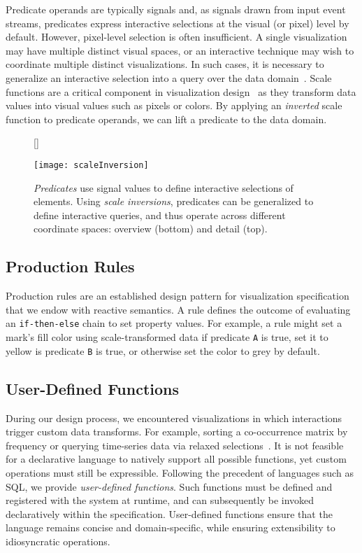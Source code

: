 Predicate operands are typically signals and, as signals drawn from input event
streams, predicates express interactive selections at the visual (or pixel)
level by default. However, pixel-level selection is often insufficient. A single
visualization may have multiple distinct visual spaces, or an interactive
technique may wish to coordinate multiple distinct visualizations. In such
cases, it is necessary to generalize an interactive selection into a query over
the data domain~\cite{heer:generalized}. Scale functions are a critical
component in visualization design~ \cite{wilkinson:grammar} as they transform
data values into visual values such as pixels or colors. By applying an
\emph{inverted} scale function to predicate operands, we can lift a predicate to
the data domain.

\begin{figure}[h!]
  [\FBwidth]
  {\caption{\emph{Predicates} use signal values to define interactive selections
of elements. Using \emph{scale inversions}, predicates can be generalized to
define interactive queries, and thus operate across different coordinate spaces:
overview (bottom) and detail (top).}
  \label{fig:vl:scaleInversion}}
  {\texttt{[image: scaleInversion]}}
\end{figure}

\subsection{Production Rules}

Production rules are an established design pattern for visualization
specification~\cite{heer:designpatterns} that we endow with reactive semantics.
A rule defines the outcome of evaluating an \texttt{if-then-else} chain to set
property values. For example, a rule might set a mark's fill color using
scale-transformed data if predicate \texttt{A} is true, set it to yellow is
predicate \texttt{B} is true, or otherwise set the color to grey by default.

\subsection{User-Defined Functions}
\label{sec:udfs}

During our design process, we encountered visualizations in which interactions
trigger custom data transforms. For example, sorting a co-occurrence matrix by
frequency or querying time-series data via relaxed
selections~\cite{holz:relaxed}. It is not feasible for a declarative language to
natively support all possible functions, yet custom operations must still be
expressible. Following the precedent of languages such as SQL, we provide
\emph{user-defined functions}. Such functions must be defined and registered
with the system at runtime, and can subsequently be invoked declaratively within
the specification. User-defined functions ensure that the language remains
concise and domain-specific, while ensuring extensibility to idiosyncratic
operations.

